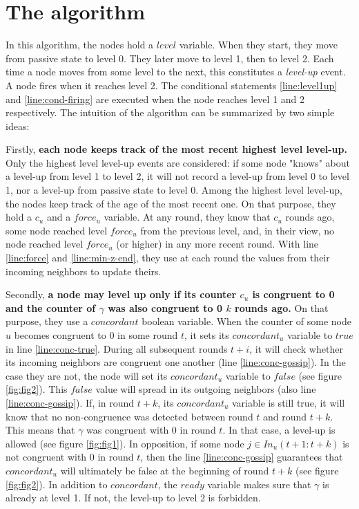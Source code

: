 \documentclass[11pt,letterpaper]{article}
\newcommand{\cent}{\gamma}
\begin{document}
\section{The algorithm}

In this algorithm, the nodes hold a $level$ variable. When they start, they move from passive state to level 0. They later move to level 1, then to level 2.
Each time a node moves from some level to the next, this constitutes a \textit{level-up} event.
A node fires when it reaches level 2.
The conditional statements \ref{line:level1up} and \ref{line:cond-firing} are executed when the node reaches level 1 and 2 respectively.
The intuition of the algorithm can be summarized by two simple ideas:

Firstly, \textbf{each node keeps track of the most recent highest level level-up.}
Only the highest level level-up events are considered: if some node "knows" about a level-up from level 1 to level 2,
it will not record a level-up from level 0 to level 1, nor a level-up from passive state to level 0.
Among the highest level level-up, the nodes keep track of the age of the most recent one.
On that purpose, they hold a $c_u$ and a $force_u$ variable.
At any round, they know that $c_u$ rounds ago, some node reached level $force_u$ from the previous level,
and, in their view, no node reached level $force_u$ (or higher) in any more recent round.
With line \ref{line:force} and \ref{line:min-z-end}, they use at each round the values from their incoming neighbors to update theirs.

Secondly, \textbf{a node may level up only if its counter $c_u$ is congruent to 0 and the counter of $\gamma$ was also congruent to 0 $k$ rounds ago.}
On that purpose, they use a $concordant$ boolean variable.
When the counter of some node $u$ becomes congruent to 0 in some round $t$, it sets its $concordant_u$ variable to $true$ in line \ref{line:conc-true}.
During all subsequent rounds $t+i$, it will check whether its incoming neighbors are congruent one another (line \ref{line:conc-gossip}).
In the case they are not, the node will set its $concordant_u$ variable to $false$ (see figure \ref{fig:fig2}).
This $false$ value will spread in its outgoing neighbors (also line \ref{line:conc-gossip}).
If, in round $t+k$, its $concordant_u$ variable is still true, it will know that no non-congruence was detected between round $t$ and round $t+k$.
This means that $\cent$ was congruent with 0 in round $t$.
In that case, a level-up is allowed (see figure \ref{fig:fig1}).
In opposition, if some node $j \in In_u(t+1:t+k)$ is not congruent with 0 in round $t$,
then the line \ref{line:conc-gossip} guarantees that $concordant_u$ will ultimately be false at the beginning of round $t+k$ (see figure \ref{fig:fig2}).
In addition to $concordant$, the $ready$ variable makes sure that $\cent$ is already at level 1.
If not, the level-up to level 2 is forbidden.
\end{document}
